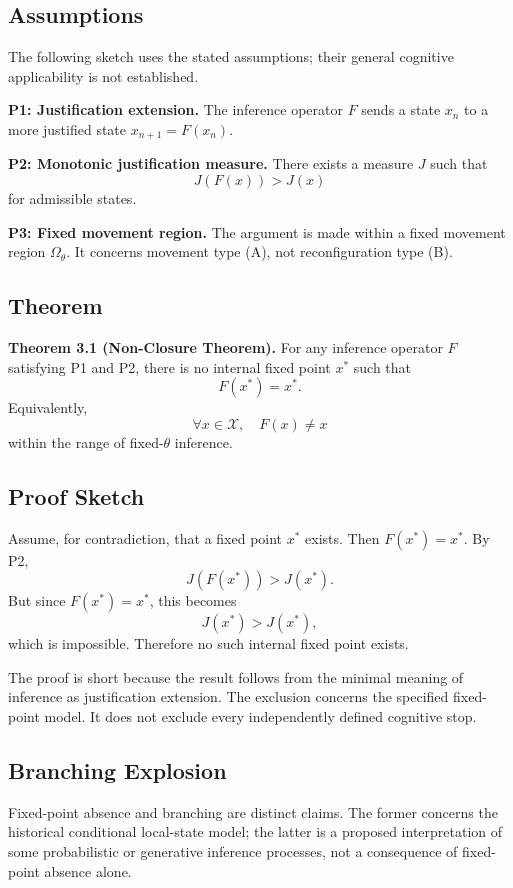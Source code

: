 \subsection{Assumptions}

The following sketch uses the stated assumptions; their general cognitive applicability is not established.

\textbf{P1: Justification extension.} The inference operator $F$ sends a state $x_n$ to a more justified state $x_{n+1}=F(x_n)$.

\textbf{P2: Monotonic justification measure.} There exists a measure $J$ such that
\[
J(F(x))>J(x)
\]
for admissible states.

\textbf{P3: Fixed movement region.} The argument is made within a fixed movement region $\Omega_\theta$. It concerns movement type (A), not reconfiguration type (B).

\subsection{Theorem}

\textbf{Theorem 3.1 (Non-Closure Theorem).}
For any inference operator $F$ satisfying P1 and P2, there is no internal fixed point $x^*$ such that
\[
F(x^*)=x^*.
\]
Equivalently,
\[
\forall x\in\mathcal{X},\quad F(x)\neq x
\]
within the range of fixed-$\theta$ inference.

\subsection{Proof Sketch}

Assume, for contradiction, that a fixed point $x^*$ exists. Then $F(x^*)=x^*$. By P2,
\[
J(F(x^*))>J(x^*).
\]
But since $F(x^*)=x^*$, this becomes
\[
J(x^*)>J(x^*),
\]
which is impossible. Therefore no such internal fixed point exists.

The proof is short because the result follows from the minimal meaning of inference as justification extension. The exclusion concerns the specified fixed-point model. It does not exclude every independently defined cognitive stop.

\subsection{Branching Explosion}

Fixed-point absence and branching are distinct claims. The former concerns the historical conditional local-state model; the latter is a proposed interpretation of some probabilistic or generative inference processes, not a consequence of fixed-point absence alone.

